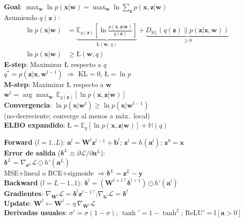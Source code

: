 \documentclass[10pt, a4paper]{article}
\newcommand{\w}{\mathbf{w}}
\newcommand{\x}{\mathbf{x}}
\newcommand{\y}{\mathbf{y}}
\newcommand{\z}{\mathbf{z}}
\newcommand{\del}{\boldsymbol{\delta}}
\newcommand{\bias}{\mathbf{b}}
\newcommand{\preact}{\mathbf{a}}
\newcommand{\W}{\mathbf{W}}
\newcommand{\Loss}{\mathcal{L}}
\newcommand{\ELBO}{\text{\L}}
\newcommand{\E}{\mathbb{E}}
\begin{document}
\begin{minipage}[t]{0.3299\textwidth}
\begin{tcolorbox}[formulabox=EM \& ELBO, colframe=softTeal]
    \textbf{Goal}: $\max_\w \ln p(\x|\w) = \max_\w \ln\sum_\z p(\x,\z|\w)$ \\[2pt]
    Asumiendo $q(\z)$:
    \begin{align*}
        \ln p(\x|\w) &= \underbrace{\E_{q(\z)}\!\left[\ln \tfrac{p(\x,\z|\w)}{q(\z)}\right]}_{\ELBO(\w,\,q)} + \underbrace{D_\mathbb{KL}(q(\z)\|p(\z|\x,\w))}_{\geq 0}\\
        \ln p(\x|\w) &\geq \ELBO(\w, q)
    \end{align*}
    \textbf{E-step}: Maximizar $\ELBO$ respecto a $q$\\
    $q^* = p(\z|\x,\w^{t-1})$ $\Rightarrow$ KL$=0$, $\ELBO=\ln p$\\
    \textbf{M-step}: Maximizar $\ELBO$ respecto a $\w$\\
    $\w^t = \arg\max_\w\,\mathbb{E}_{q(\z)}[\ln p(\x,\z|\w)]$\\
    \textbf{Convergencia}: $\ln p(\x|\w^t)\geq \ln p(\x|\w^{t-1})$\\
    (no-decreciente; converge al menos a máx.\ local)\\[2pt]
    \textbf{ELBO expandido}: $\ELBO = \mathbb{E}_q[\ln p(\x,\z|\w)] + \mathbb{H}(q)$
\end{tcolorbox}

\begin{tcolorbox}[formulabox={Backpropagation}]
    \textbf{Forward} ($l=1..L$): $\preact^l = \W^l\z^{l-1}+\bias^l$;\; $\z^l = h(\preact^l)$;\; $\z^0=\x$\\[2pt]
    \textbf{Error de salida} ($\del^L \equiv \partial\Loss/\partial\preact^L$):\\
    $\del^L = \nabla_{\z^L}\Loss \odot h'(\preact^L)$\\
    MSE+lineal o BCE+sigmoide $\Rightarrow \del^L=\z^L-\y$\\[2pt]
    \textbf{Backward} ($l=L{-}1..1$): $\del^l = (\W^{l+1\top}\del^{l+1})\odot h'(\preact^l)$\\[2pt]
    \textbf{Gradientes}: $\nabla_{\W^l}\Loss = \del^l\z^{l-1\top}$;\quad $\nabla_{\bias^l}\Loss = \del^l$\\[2pt]
    \textbf{Update}: $\W^l \leftarrow \W^l - \eta\,\nabla_{\W^l}\Loss$\\[2pt]
    \textbf{Derivadas usuales}: $\sigma'=\sigma(1-\sigma)$;\; $\tanh'=1-\tanh^2$;\; $\text{ReLU}'=\mathbb{I}[\preact>0]$
\end{tcolorbox}


\end{minipage}
\end{document}
